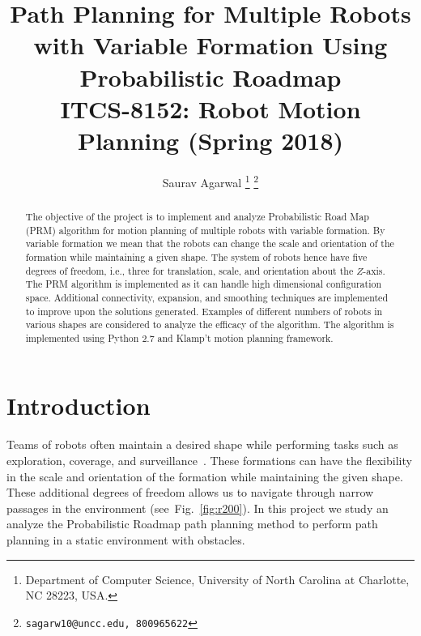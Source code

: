 \documentclass[12pt,a4paper, onecolumn]{IEEEtran}
\author{Saurav Agarwal
  \thanks{Department of Computer Science, University of North
  Carolina at Charlotte, NC 28223, USA.}%
  \thanks{{\tt \small sagarw10@uncc.edu, 800965622}} %

}
\newcommand{\fgref}[1]{Fig.~\ref{#1}}
\begin{document}
\title{{\Large \bf Path Planning for Multiple Robots with Variable Formation Using
Probabilistic Roadmap}\\{\large ITCS-8152: Robot Motion Planning} {\large (Spring 2018)} }
\maketitle
\begin{abstract}
%
  The objective of the project is to implement and analyze Probabilistic Road Map (PRM) algorithm for motion planning of multiple robots with variable formation. By variable formation we mean that the robots can change the scale and orientation of the formation while maintaining a given shape. The system of robots hence have five degrees of freedom, i.e., three for translation, scale, and orientation about the $Z$-axis. The PRM algorithm is implemented as it can handle high dimensional configuration space. Additional connectivity, expansion, and smoothing techniques are implemented to improve upon the solutions generated. Examples of different numbers of robots in various shapes are considered to analyze the efficacy of the algorithm. The algorithm is implemented using Python 2.7 and Klamp't motion planning framework.
\end{abstract}

\section{Introduction}
%
Teams of robots often maintain a desired shape while performing tasks such as exploration,
coverage, and surveillance~\cite{TurpinMK12ICRA}. These formations can have the
flexibility in the scale and orientation of the formation while maintaining the given
shape. These additional degrees of freedom allows us to navigate through narrow passages
in the environment (see~\fgref{fig:r200}). In this project we study an analyze the
Probabilistic Roadmap path planning method to perform path planning in
a static environment with obstacles.
\end{document}
